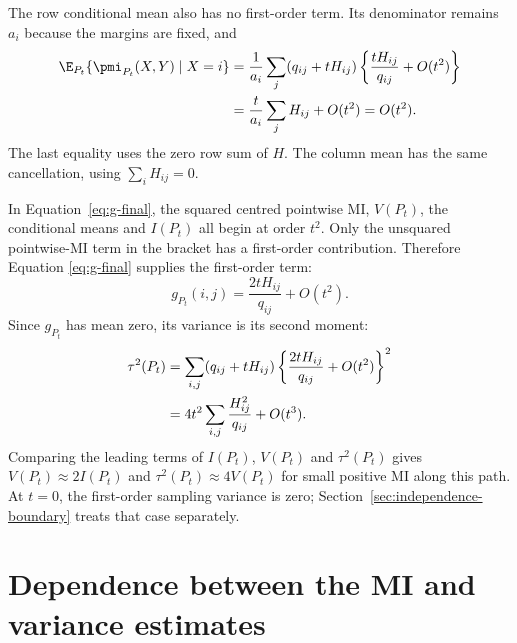The row conditional mean also has no first-order term. Its denominator
remains \(a_i\) because the margins are fixed, and
\begin{align*}
 \E_{P_t}\{\pmi_{P_t}(X,Y)\mid X=i\}
 &=\frac{1}{a_i}\sum_j(q_{ij}+tH_{ij})
   \left\{\frac{tH_{ij}}{q_{ij}}+O(t^2)\right\}\\*
 &=\frac{t}{a_i}\sum_jH_{ij}+O(t^2)
 =O(t^2).
\end{align*}
The last equality uses the zero row sum of \(H\). The column mean has the
same cancellation, using \(\sum_iH_{ij}=0\).

In Equation~\eqref{eq:g-final}, the squared centred pointwise MI,
\(V(P_t)\), the conditional means and \(I(P_t)\) all begin at order
\(t^2\). Only the unsquared pointwise-MI term in the bracket has a
first-order contribution. Therefore Equation
\eqref{eq:g-final} supplies the first-order term:
\begin{equation}
 g_{P_t}(i,j)=\frac{2tH_{ij}}{q_{ij}}+O(t^2).
\end{equation}
Since \(g_{P_t}\) has mean zero, its variance is its second moment:
\begin{align}
 \tau^2(P_t)
 &=\sum_{i,j}(q_{ij}+tH_{ij})
   \left\{\frac{2tH_{ij}}{q_{ij}}+O(t^2)\right\}^2\notag\\*
 &=4t^2\sum_{i,j}\frac{H_{ij}^2}{q_{ij}}+O(t^3).
\end{align}
Comparing the leading terms of \(I(P_t)\), \(V(P_t)\) and \(\tau^2(P_t)\)
gives \(V(P_t)\approx2I(P_t)\) and
\(\tau^2(P_t)\approx4V(P_t)\) for small positive MI along this path.
At \(t=0\), the first-order sampling variance is zero;
Section~\ref{sec:independence-boundary} treats that case separately.

\section{Dependence between the MI and variance estimates}
\label{sec:mi-variance-covariance}

